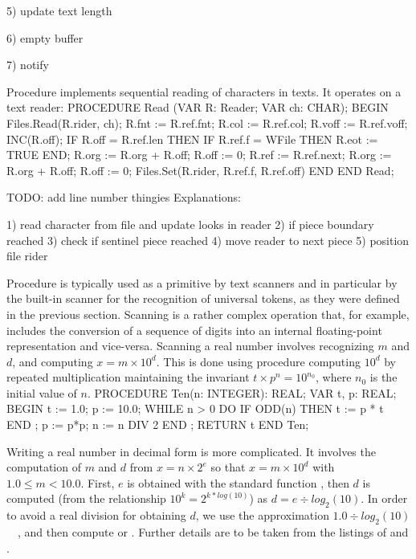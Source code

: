 5) update text length

6) empty buffer

7) notify

\noindent Procedure  implements sequential reading of characters in texts. It operates on a text reader:
\begintt
PROCEDURE Read (VAR R: Reader; VAR ch: CHAR);
BEGIN
  Files.Read(R.rider, ch);
  R.fnt := R.ref.fnt;
  R.col := R.ref.col;
  R.voff := R.ref.voff;
  INC(R.off);
  IF R.off = R.ref.len THEN
    IF R.ref.f = WFile THEN R.eot := TRUE END;
    R.org := R.org + R.off; R.off := 0;
    R.ref := R.ref.next; R.org := R.org + R.off; R.off := 0;
    Files.Set(R.rider, R.ref.f, R.ref.off)
  END
END Read;
\endtt

TODO: add line number thingies
Explanations:

1) read character from file and update looks in reader
2) if piece boundary reached
3) check if sentinel piece reached
4) move reader to next piece
5) position file rider

Procedure  is typically used as a primitive by text
scanners and in particular by the built-in scanner  for the
recognition of universal tokens, as they were defined in the previous
section. Scanning is a rather complex operation that, for example,
includes the conversion of a sequence of digits into an internal
floating-point representation and vice-versa. Scanning a real number
involves recognizing $m$ and $d$, and computing $x = m \times 10^d$.
This is done using procedure  computing $10^d$ by
repeated multiplication maintaining the invariant
$t \times p^n = 10^{n_0}$, where $n_0$ is the initial value of $n$.
\begintt
PROCEDURE Ten(n: INTEGER): REAL;
  VAR t, p: REAL;
BEGIN
  t := 1.0;
  p := 10.0;
  WHILE n > 0 DO
    IF ODD(n) THEN t := p * t END ;
    p := p*p;
    n := n DIV 2
  END ;
  RETURN t
END Ten;
\endtt

\noindent Writing a real number in decimal form is more complicated. It involves the computation of $m$ and $d$ from $x = n \times 2^e$ so that $x = m \times 10^d$ with $1.0 \le m < 10.0$. First, $e$ is obtained with the standard function , then $d$ is computed (from the relationship
$10^k = 2^{k*log(10)}$) as $d = e \div log_2(10)$.
In order to avoid a real division for obtaining $d$,
we use the approximation $1.0 \div log_2(10) $~\equiv~,
and then compute
 or .
Further details are to be taken from the listings of  and .


